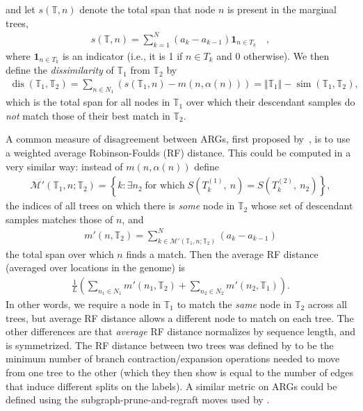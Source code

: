 \documentclass[10pt,twoside,lineno]{gsajnl}
\newcommand{\T}{\mathbb{T}}
\newcommand{\ind}{\mathbf{1}}
\newcommand{\dis}{\operatorname{dis}}
\newcommand{\similarity}{\operatorname{sim}}
\begin{document}
and let $s(\T,n)$ denote
the total span that node $n$ is present in the marginal trees,
\begin{align*}
    s(\T, n) = \sum_{k=1}^N (a_k - a_{k-1}) \ind_{n \in T_k} \quad ,
\end{align*}
where $\ind_{n \in T_k}$ is an indicator (i.e., it is 1 if $n \in T_k$ and 0 otherwise).
We then define the \emph{dissimilarity} of $\T_1$ from $\T_2$ by
\begin{align*}
    \dis(\T_1, \T_2)
    =
    \sum_{n \in N_1} (s(\T_1, n) - m(n, \alpha(n))) 
    = 
    \Vert \T_1\Vert -\similarity(\T_1,\T_2),
\end{align*}
which is the total span for all nodes in $\T_1$
over which their descendant samples do \emph{not} match those of their best match in $\T_2$.

A common measure of disagreement between ARGs, 
first proposed by~\cite{kuhner2015assessing}, 
is to use a weighted average Robinson-Foulds (RF) distance.
This could be computed in a very similar way:
instead of $m(n, \alpha(n))$ define
\begin{align*}
    \mathcal{M}'(\T_1, n; \T_2) = \left\{ k : \exists n_2  \;\text{for which}\; S\left(T^{(1)}_k,\ n\right) = S\left(T^{(2)}_k,\ n_2\right) \right\},
\end{align*}
the indices of all trees on which there is \emph{some} node in $\T_2$
whose set of descendant samples matches those of $n$, and
\begin{align*}
    m'(n, \T_2) = \sum_{k \in \mathcal{M}'(\T_1, n; \T_2)}^N (a_k - a_{k-1})
\end{align*}
the total span over which $n$ finds a match.
Then the average RF distance (averaged over locations in the genome)
is
\begin{align*}
    \frac{1}{L} \left( \sum_{n_1 \in N_1} m'(n_1, \T_2)  + \sum_{n_2 \in N_2} m'(n_2, \T_1) \right).
\end{align*}
In other words, we require a node in $\T_1$ to match the \emph{same} node in $\T_2$
across all trees, but average RF distance allows a different node to match
on each tree.
The other differences are that \emph{average} RF distance
normalizes by sequence length, and is symmetrized.
The RF distance between two trees
was defined by \citet{robinson1981comparison}
to be the minimum number of branch contraction/expansion operations needed to move
from one tree to the other
(which they then show is equal to the number of edges 
that induce different splits on the labels).
A similar metric on ARGs could be defined
using the subgraph-prune-and-regraft moves used by \citet{deng2024robust}.
\end{document}
